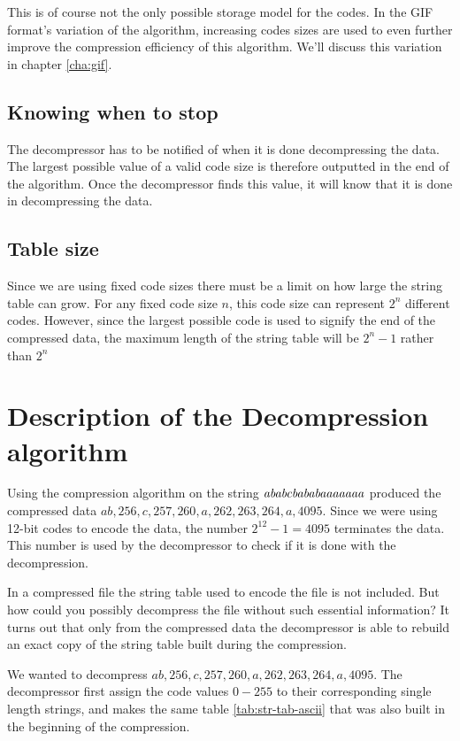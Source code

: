 This is of course not the only possible storage model for the
codes. In the GIF format's variation of the \lzw algorithm, increasing
codes sizes are used to even further improve the compression
efficiency of this algorithm. We'll discuss this variation in chapter
\ref{cha:gif}.

\subsection{Knowing when to stop}

The decompressor has to be notified of when it is done decompressing
the data. The largest possible value of a valid code size is therefore
outputted in the end of the algorithm. Once the decompressor finds
this value, it will know that it is done in decompressing the data.

\subsection{Table size}

Since we are using fixed code sizes there must be a limit on how large
the string table can grow. For any fixed code size $n$, this code size
can represent $2^n$ different codes. However, since the largest
possible code is used to signify the end of the compressed data, the
maximum length of the string table will be $2^n - 1$ rather than $2^n$

\section{Description of the Decompression algorithm}

Using the compression algorithm \lzw on the string
$\mathit{ababcbababaaaaaaa}$ produced the compressed data $ab, 256,c,
257, 260, a, 262, 263, 264, a,4095$. Since we were using 12-bit codes
to encode the data, the number $2^{12} - 1 = 4095$ terminates the
data. This number is used by the decompressor to check if it is done
with the decompression.

In a \lzw compressed file the string table used to encode the file is
not included. But how could you possibly decompress the file without
such essential information? It turns out that only from the compressed
data the decompressor is able to rebuild an exact copy of the string
table built during the compression.

We wanted to decompress $ab, 256,c, 257, 260, a, 262, 263, 264,
a,4095$. The decompressor first assign the code values $0-255$ to
their corresponding single length strings, and makes the same table
\ref{tab:str-tab-ascii} that was also built in the beginning of the
compression.

